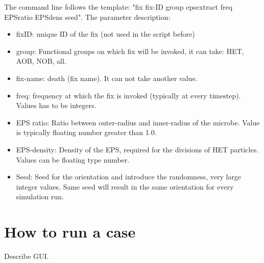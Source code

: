 \documentclass[11pt,a4paper,openright]{article}
\begin{document}
The command line follows the template: "fix fix-ID group epsextract freq EPSratio EPSdens seed". The parameter description:
\begin{itemize}
\item fixID: unique ID of the fix (not used in the script before)
\item group: Functional groups on which fix will be invoked, it can take: HET, AOB, NOB, all.
\item fix-name: death (fix name). It can not take another value.
\item freq: frequency at which the fix is invoked (typically at every timestep). Values has to be integers.
\item EPS ratio: Ratio between outer-radius and inner-radius of the microbe. Value is typically floating number greater than 1.0.
\item EPS-density: Density of the EPS, required for the divisions of HET particles. Values can be floating type number.
\item Seed: Seed for the orientation and introduce the randomness, very large integer values. Same seed will result in the same orientation for every simulation run.
\end{itemize}

\section{How to run a case}
Describe GUI.



\label{References}
\small
\end{document}

